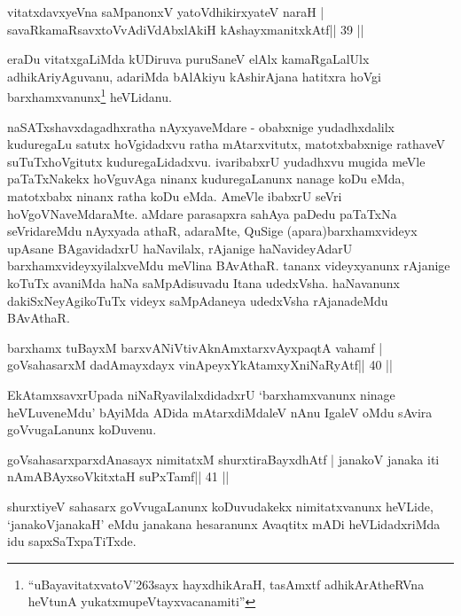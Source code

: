 \begin{shl}
vitatxdavxyeVna saMpanonxV yatoV\s dhikirxyateV naraH |
savaRkamaRsavxtoV\s vAdiVdAbxlAkiH kAshayxmanitxkAtf\hfill || 39 ||
\end{shl}

\begin{artha}
eraDu vitatxgaLiMda kUDiruva puruSaneV elAlx kamaRgaLalUlx adhikAriyAguvanu, adariMda bAlAkiyu kAshirAjana hatitxra hoVgi barxhamxvanunx\footnote{``uBayavitatxvatoV\char'263sayx hayxdhikAraH, tasAmxtf adhikArAtheRVna heVtunA yukatxmupeVtayxvacanamiti''} heVLidanu.
\end{artha}

\begin{artha}
naSATxshavxdagadhxratha nAyxyaveMdare - obabxnige yudadhxdalilx 
kuduregaLu satutx hoVgidadxvu ratha mAtarxvitutx, matotxbabxnige 
rathaveV suTuTxhoVgitutx kuduregaLidadxvu. ivaribabxrU yudadhxvu mugida 
meVle paTaTxNakekx hoVguvAga ninanx kuduregaLanunx nanage koDu eMda, 
matotxbabx ninanx ratha koDu eMda. AmeVle ibabxrU seVri 
hoVgoVNaveMdaraMte. aMdare parasapxra sahAya paDedu paTaTxNa 
seVridareMdu nAyxyada athaR, adaraMte, QuSige (apara)barxhamxvideyx upAsane BAgavidadxrU haNavilalx, rAjanige haNavideyAdarU barxhamxvideyxyilalxveMdu meVlina BAvAthaR. tananx videyxyanunx rAjanige koTuTx avaniMda haNa saMpAdisuvadu Itana udedxVsha. haNavanunx dakiSxNeyAgikoTuTx videyx saMpAdaneya udedxVsha rAjanadeMdu BAvAthaR.
\end{artha}


\begin{shl}
barxhamx tuBayxM barxvANiVtivAknAmxtarxvAyxpaqtA vahamf |
goVsahasarxM dadAmayxdayx vinApeyxYkAtamxyXniNaRyAtf\hfill || 40 ||
\end{shl}

\begin{artha}
EkAtamxsavxrUpada niNaRyavilalxdidadxrU `barxhamxvanunx ninage 
heVLuveneMdu' bAyiMda ADida mAtarxdiMdaleV nAnu IgaleV oMdu sAvira goVvugaLanunx koDuvenu.
\end{artha}

\begin{shl}
goVsahasarxparxdAnasayx nimitatxM shurxtiraBayxdhAtf |
janakoV janaka iti nAmABAyxsoVkitxtaH suPxTamf\hfill || 41 ||
\end{shl}

\begin{artha}
shurxtiyeV sahasarx goVvugaLanunx koDuvudakekx nimitatxvanunx heVLide, 
`janakoVjanakaH' eMdu janakana hesaranunx Avaqtitx mADi heVLidadxriMda idu sapxSaTxpaTiTxde.
\end{artha}


